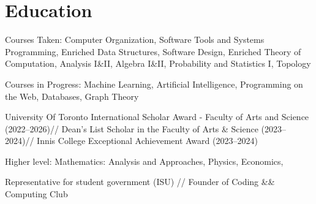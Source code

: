 \documentclass[letterpaper,10pt]{article}
\begin{document}

    \section{Education}

        \begin{resume_list}
            \item Courses Taken: Computer Organization, Software Tools and Systems Programming, Enriched Data Structures, Software Design, Enriched Theory of Computation, %
            Analysis I\&II, Algebra I\&II, Probability and Statistics I, Topology
            \item Courses in Progress: Machine Learning, Artificial Intelligence, Programming on the Web, Databases, Graph Theory
            \item University Of Toronto International Scholar Award - Faculty of Arts and Science (2022--2026)//
            Dean’s List Scholar in the Faculty of Arts \& Science (2023--2024)//
            Innis College Exceptional Achievement Award (2023--2024)
        \end{resume_list}
    \vspace{5pt} 
    \begin{resume_list}
        \item Higher level: Mathematics: Analysis and Approaches, 
        Physics, Economics, 
        \item Representative for student government (ISU) // Founder of Coding \&\& Computing Club
    \end{resume_list}


\end{document}
